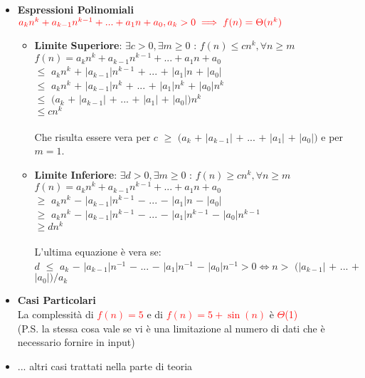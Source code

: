 \documentclass[../cheatSheetAlgoritmi.tex]{subfiles}
\begin{document}
\begin{itemize}
	\item \textbf{Espressioni Polinomiali}\\
		$\textcolor{red}{a_{k} n^k + a_{k-1} n^{k-1} + ... + a_{1}n + a_{0}, a_{k} > 0 \implies f(n) = \Theta(n^k)}$
		\begin{itemize}
			\item \textbf{Limite Superiore}: $\exists c > 0, \exists m \geq 0$ : $f(n) \leq cn^k, \forall n \geq m$\\
			$f(n) = a_{k} n^k + a_{k-1} n^{k-1} + ... + a_{1}n + a_{0}$\\
			$\leq$ $a_{k}n^k$ $+$ $\mid$$a_{k-1}$$\mid$$n^{k-1}$ $+$ ... $+$ $\mid$$a_{1}$$\mid$$n$ $+$ $\mid$$a_{0}$$\mid$ \\
			$\leq$ $a_{k}n^k$ $+$ $\mid$$a_{k-1}$$\mid$$n^{k}$ $+$ ... $+$ $\mid$$a_{1}$$\mid$$n^k$ $+$ $\mid$$a_{0}$$\mid$$n^k$ \\
			$\leq$ $(a_{k}$ $+$ $\mid$$a_{k-1}$$\mid$ $+$ ... $+$ $\mid$$a_{1}$$\mid$ $+$ $\mid$$a_{0}$$\mid$$)n^k$\\
			$\leq cn^k$\\\\
			Che risulta essere vera per $c$ $\geq$ $(a_{k}$ $+$ $\mid$$a_{k-1}$$\mid$ $+$ ... $+$ $\mid$$a_{1}$$\mid$ $+$ $\mid$$a_{0}$$\mid$$)$ e per $m = 1$.\\
			\item \textbf{Limite Inferiore}: $\exists d > 0, \exists m \geq 0$ : $f(n) \geq cn^k, \forall n \geq m$\\
			$f(n) = a_{k} n^k + a_{k-1} n^{k-1} + ... + a_{1}n + a_{0}$\\
			$\geq$ $a_{k}n^k$ $-$ $\mid$$a_{k-1}$$\mid$$n^{k-1}$ $-$ ... $-$ $\mid$$a_{1}$$\mid$$n$ $-$ $\mid$$a_{0}$$\mid$ \\
			$\geq$ $a_{k}n^k$ $-$ $\mid$$a_{k-1}$$\mid$$n^{k-1}$ $-$ ... $-$ $\mid$$a_{1}$$\mid$$n^{k-1}$ $-$ $\mid$$a_{0}$$\mid$$n^{k-1}$ \\
			$\geq dn^k$\\\\
			L'ultima equazione è vera se:\\
			$d$ $\leq$ $a_{k}$ $-$ $\mid$$a_{k-1}$$\mid$$n^{-1}$ $-$ ... $-$ $\mid$$a_{1}$$\mid$$n^{-1}$ $-$ $\mid$$a_{0}$$\mid$$n^{-1} > 0 \iff n >$ $(\mid$$a_{k-1}$$\mid$ $+$ ... $+$ $\mid$$a_{0}$$\mid)/a_{k}$
		\end{itemize}
	\item \textbf{Casi Particolari}\\
		La complessità di \textcolor{red}{$f(n) = 5$} e di \textcolor{red}{$f(n) = 5 + \sin(n)$} è \textcolor{red}{ $\Theta$(1)}\\
		(P.S. la stessa cosa vale se vi è una limitazione al numero di dati che è necessario fornire in input)
	\item ... altri casi trattati nella parte di teoria
\end{itemize}
\end{document}
